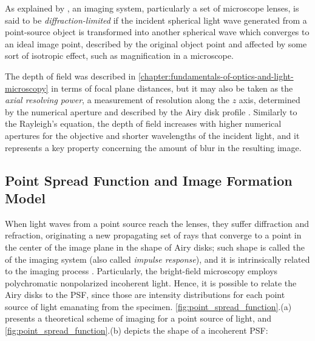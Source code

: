 As explained by , an imaging system, particularly a set of microscope lenses, is said to be \emph{diffraction-limited} if the incident spherical light wave generated from a point-source object is transformed into another spherical wave which converges to an ideal image point, described by the original object point and affected by some sort of isotropic effect, such as magnification in a microscope.

The depth of field was described in \autoref{chapter:fundamentals-of-optics-and-light-microscopy} in terms of focal plane distances, but it may also be taken as the \emph{axial resolving power}, a measurement of resolution along the $z$ axis, determined by the numerical aperture and described by the Airy disk profile \cite{davidson2002optical}. Similarly to the Rayleigh's equation, the depth of field increases
with higher numerical apertures for the objective and shorter wavelengths of the incident light, and it represents a key property concerning the amount of blur in the resulting image.


\subsection{Point Spread Function and Image Formation Model}

\label{sec:point_spread_function_and_image_formation_model}

When light waves from a point source reach the lenses, they suffer diffraction and refraction, originating a new propagating set of rays that converge to a point in the center of the image plane in the shape of Airy disks; such shape is called the 
of the imaging system (also called \emph{impulse response}), and it is intrinsically related to the imaging process \cite{wu2008microscope}. Particularly, the bright-field microscopy employs polychromatic nonpolarized incoherent light. Hence, it is possible to relate the Airy disks to the PSF, since those are intensity distributions for each point source of light emanating from the specimen. \autoref{fig:point_spread_function}.(a) presents a theoretical scheme of imaging for a point source of light, and \autoref{fig:point_spread_function}.(b) depicts the shape of a incoherent PSF:

